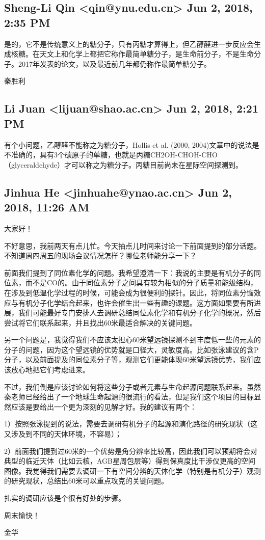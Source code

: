 \documentclass{article}
\newcommand\from[2]{\subsection{{#1} {#2}}}
\newcommand\said[1]{#1}
\begin{document}
\from{
Sheng-Li Qin <qin@ynu.edu.cn>
}{
Jun 2, 2018, 2:35 PM
}
\said{
是的，它不是传统意义上的糖分子，只有丙糖才算得上，但乙醇醛进一步反应会生成核糖。在天文上和化学上都把它称作最简单糖分子，是生命前分子，不是生命分子。2017年发表的论文，以及最近前几年都仍称作最简单糖分子。

秦胜利
}

\from{
Li Juan <lijuan@shao.ac.cn>
}{
Jun 2, 2018, 2:21 PM
}
\said{
有个小问题，乙醇醛不能称之为糖分子，Hollis et al. (2000, 2004)文章中的说法是不准确的，具有3个碳原子的单糖，也就是丙糖CH2OH-CHOH-CHO（glyceraldehyde）才可以称之为糖分子。丙糖目前尚未在星际空间探测到。
}



\from{
Jinhua He <jinhuahe@ynao.ac.cn>
}{
Jun 2, 2018, 11:26 AM
}
\said{
大家好！

不好意思，我前两天有点儿忙。今天抽点儿时间来讨论一下前面提到的部分话题。不知道周四周五的现场会议情况怎样？哪位老师能分享一下？

前面我们提到了同位素化学的问题。我希望澄清一下：我说的主要是有机分子的同位素，而不是CO的。由于同位素分子之间具有较为相似的分子质量和能级结构，在涉及到低温化学过程的时候，可能会成为很便利的探针。因此，将同位素分馏效应与有机分子化学结合起来，也许会催生出一些有趣的课题。这方面如果要有所进展，我们可能最好专门安排人去调研总结同位素化学和有机分子化学的概况，然后尝试将它们联系起来，并且找出60米最适合解决的关键问题。

另一个问题是，我觉得我们不应该太担心60米望远镜探测不到丰度低一些的元素的分子的问题，因为这个望远镜的优势就是口径大，灵敏度高。比如张泳建议的含P分子，以及前面提及的同位素分子等，观测它们更能体现60米望远镜优势，我们应该放心地把它们考虑进来。

不过，我们倒是应该讨论如何将这些分子或者元素与生命起源问题联系起来。虽然秦老师已经给出了一个地球生命起源的很流行的看法，但是我们这个项目的目标显然应该是要给出一个更为深刻的见解才好。我的建议有两个：

1）按照张泳提到的说法，需要去调研有机分子的起源和演化路径的研究现状（这又涉及到不同的天体环境，不容易）；

2）前面我们提到过60米的一个优势是角分辨率比较高，因此我们可以预期将会对典型的临近天体（比如云核，AGB星周包层等）得到保真度比干涉仪更高的空间图像。我觉得我们需要去调研一下有空间分辨的天体化学（特别是有机分子）观测的研究现状，总结出60米可以重点攻克的关键问题。

扎实的调研应该是个很有好处的步骤。

周末愉快！

金华
}
\end{document}
